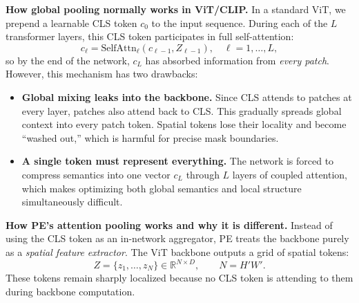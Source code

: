 \begin{enrichment}
\begin{enrichment}
\begin{itemize}
	       \noindent\textbf{How global pooling normally works in ViT/CLIP.}
	       In a standard ViT, we prepend a learnable CLS token $c_0$ to the input
	       sequence. During each of the $L$ transformer layers, this CLS token participates
	       in full self-attention:
	       \[
	       c_{\ell} = \text{SelfAttn}_{\ell}(c_{\ell-1}, Z_{\ell-1}),
	       \quad \ell = 1,\dots,L,
	       \]
	       so by the end of the network, $c_L$ has absorbed information from
	       \emph{every patch}. However, this mechanism has two drawbacks:
	       \begin{itemize}
	       	\item \textbf{Global mixing leaks into the backbone.} Since CLS attends to
	       	patches at every layer, patches also attend back to CLS. This
	       	gradually spreads global context into every patch token.
	       	Spatial tokens lose their locality and become ``washed out,'' which is
	       	harmful for precise mask boundaries.
	       	\item \textbf{A single token must represent everything.}
	       	The network is forced to compress semantics into one vector
	       	$c_L$ through $L$ layers of coupled attention, which makes optimizing
	       	both global semantics and local structure simultaneously difficult.
	       \end{itemize}
	       
	       \medskip
	       \noindent\textbf{How PE's attention pooling works and why it is different.}
	       Instead of using the CLS token as an in-network aggregator, PE treats the
	       backbone purely as a \emph{spatial feature extractor}. The ViT backbone outputs a
	       grid of spatial tokens:
	       \[
	       Z = \{z_1,\dots,z_N\} \in \mathbb{R}^{N\times D},
	       \qquad N = H'W'.
	       \]
	       These tokens remain sharply localized because no CLS token is attending to them
	       during backbone computation.
	       

\end{itemize}
\end{enrichment}
\end{enrichment}
